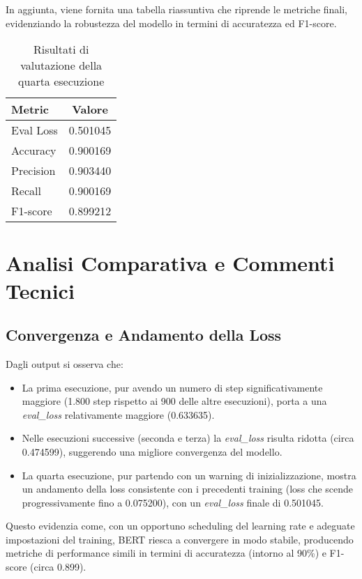 \documentclass[a4paper,12pt]{article}
\begin{document}
In aggiunta, viene fornita una tabella riassuntiva che riprende le metriche finali, evidenziando la robustezza del modello in termini di accuratezza ed F1-score.

\begin{table}[h!]
    \centering
    \begin{tabular}{@{}lc@{}}
    \toprule
    \textbf{Metric}    & \textbf{Valore} \\ \midrule
    Eval Loss  & 0.501045 \\
    Accuracy   & 0.900169 \\
    Precision  & 0.903440 \\
    Recall     & 0.900169 \\
    F1-score   & 0.899212 \\ \bottomrule
    \end{tabular}
    \caption{Risultati di valutazione della quarta esecuzione}
    \label{tab:risultati}
\end{table}

\section{Analisi Comparativa e Commenti Tecnici}
\subsection{Convergenza e Andamento della Loss}
Dagli output si osserva che:
\begin{itemize}
    \item La prima esecuzione, pur avendo un numero di step significativamente maggiore (1.800 step rispetto ai 900 delle altre esecuzioni), porta a una \textit{eval\_loss} relativamente maggiore (0.633635).  
    \item Nelle esecuzioni successive (seconda e terza) la \textit{eval\_loss} risulta ridotta (circa 0.474599), suggerendo una migliore convergenza del modello.
    \item La quarta esecuzione, pur partendo con un warning di inizializzazione, mostra un andamento della loss consistente con i precedenti training (loss che scende progressivamente fino a 0.075200), con un \textit{eval\_loss} finale di 0.501045.
\end{itemize}
Questo evidenzia come, con un opportuno scheduling del learning rate e adeguate impostazioni del training, BERT riesca a convergere in modo stabile, producendo metriche di performance simili in termini di accuratezza (intorno al 90\%) e F1-score (circa 0.899).
\end{document}
